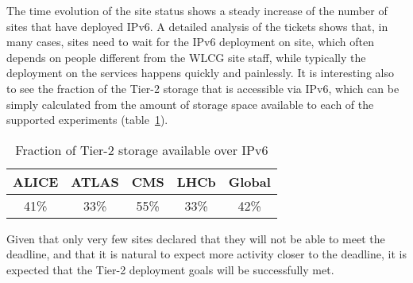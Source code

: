 The time evolution of the site status shows a steady increase of the
number of sites that have deployed IPv6. A detailed analysis of the
tickets shows that, in many cases, sites need to wait for the IPv6
deployment on site, which often depends on people different from the
WLCG site staff, while typically the deployment on the services
happens quickly and painlessly. It is interesting also to see the
fraction of the Tier-2 storage that is accessible via IPv6, which can
be simply calculated from the amount of storage space available to
each of the supported experiments (table~\ref{tab:t2stor}).
\begin{table}[h]
\centering
\caption{Fraction of Tier-2 storage available over IPv6}
\label{tab:t2stor}
\begin{tabular}{ccccc}
\hline
ALICE & ATLAS & CMS & LHCb & Global \\\hline
41\% & 33\% & 55\% & 33\% & 42\% \\\hline
\end{tabular}
\end{table}
Given that only very few sites declared that they will not be able to
meet the deadline, and that it is natural to expect more activity closer to
the deadline, it is expected that the Tier-2 deployment
goals will be successfully met.
